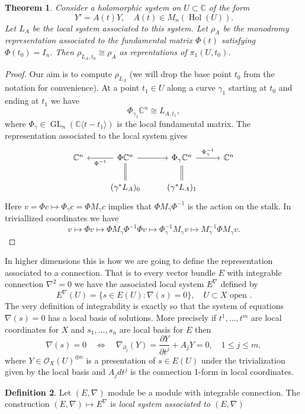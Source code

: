 \documentclass[12pt]{book}
\numberwithin{equation}{section}
\newtheorem{theorem}{Theorem}[subsection]
\theoremstyle{definition}
\newtheorem{definition}[theorem]{Definition}
\theoremstyle{remark}
\newcommand{\CC}{\mathbb{C}}
\newcommand{\Ocal}{\mathcal{O}}
\newcommand{\hol}{\operatorname{Hol}}
\newcommand{\GL}{\operatorname{GL}}
\begin{document}
\begin{theorem}
	Consider a holomorphic system on $U\subset \CC$ of the form 
	$$ Y' = A(t) Y, \quad A(t) \in M_n(\hol(U)). $$
	Let $L_A$ be the local system associated to this system. 
	Let $\rho_A$ be the monodromy representation associated to the fundamental matrix $\Phi(t)$ satisfying $\Phi(t_0)=I_n$. 
	Then $\rho_{L_A,t_0} \cong \rho_A$ as reprentations of $\pi_1(U,t_0)$.
\end{theorem}
\begin{proof}
	Our aim is to compute $\rho_{L_A}$ (we will drop the base point $t_0$ from the notation for convenience). 
	At a point $t_1\in U$ along a curve $\gamma_1$ starting at $t_0$ and ending at $t_1$ we have 
	$$ \Phi_{\gamma_1} \CC^n \cong L_{A,t_1},$$
	where $\Phi_{\gamma} \in \GL_n(\CC\langle t-t_1\rangle)$ is the local fundamental matrix. 
	The representation associated to the local system gives 
	$$\begin{tikzcd}
	\CC^n & \arrow[l, "\Phi ^{-1}"] \Phi \CC^n \arrow[r] & \Phi_{\gamma} \CC^n \arrow[r, "\Phi_{\gamma}^{-1}"] & \CC^n  \\
	& (\gamma^*L_A)_0 \ar[u, equal] & (\gamma^*L_A)_1 \ar[u, equal]& 
	\end{tikzcd}
	$$
	Here $v= \Phi c \mapsto \Phi_{\gamma} c = \Phi M_{\gamma} c$ implies that $\Phi M_{\gamma} \Phi^{-1}$ is the action on the stalk. 
	In triviallized coordinates we have 
	$$ v \mapsto \Phi v \mapsto \Phi M_{\gamma} \Phi^{-1} \Phi v \mapsto \Phi_{\gamma}^{-1} M_{\gamma} v \mapsto M_{\gamma}^{-1} \Phi M_{\gamma} v.$$
\end{proof}
In higher dimensions this is how we are going to define the representation associated to a connection. 
That is to every vector bundle $E$ with integrable connection $\nabla^2=0$ we have the associated local system $E^{\nabla}$ defined by 
 $$ E^{\nabla}(U) = \lbrace s \in E(U) \colon \nabla(s)=0 \rbrace, \quad U \subset X \mbox{ open }. $$
The very definition of integrability is exactly so that the system of equations $\nabla(s)=0$ has a local basis of solutions. 
More precisely if $t^1,\ldots,t^m$ are local coordinates for $X$ and $s_1,\ldots,s_n$ are local basis for $E$ then 
 $$ \nabla(s)=0 \quad \iff  \quad \nabla_{\partial_j}(Y) = \dfrac{\partial Y}{\partial t^j} + A_j Y =0, \quad 1\leq j \leq m,$$
where $Y\in \Ocal_X(U)^{\oplus n}$ is a presentation of $s \in E(U)$ under the trivialization given by the local basis and $A_jdt^j$ is the connection 1-form in local coordinates.

\begin{definition}
	Let $(E,\nabla)$ module be a module with integrable connection. 
	The construction $(E,\nabla)\mapsto E^{\nabla}$ is \emph{local system associated to $(E,\nabla)$} 
\end{definition}
\end{document}
